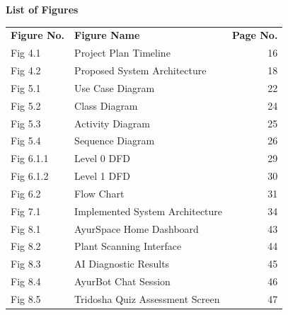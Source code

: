 \documentclass[12pt]{article}
\begin{document}
\thispagestyle{fancy}
\begin{center}
    \textbf{\LARGE List of Figures}
\end{center}

\vspace{1cm}

\begin{tabular}{ l l r }
\textbf{Figure No.} & \textbf{Figure Name} & \textbf{Page No.} \\[0.5cm]

Fig 4.1  & Project Plan Timeline           & 16 \\
Fig 4.2  & Proposed System Architecture    & 18 \\
Fig 5.1  & Use Case Diagram                & 22 \\
Fig 5.2  & Class Diagram                   & 24 \\
Fig 5.3  & Activity Diagram                & 25 \\
Fig 5.4  & Sequence Diagram                & 26 \\
Fig 6.1.1 & Level 0 DFD                   & 29 \\
Fig 6.1.2 & Level 1 DFD                   & 30 \\
Fig 6.2  & Flow Chart                      & 31 \\
Fig 7.1  & Implemented System Architecture & 34 \\
Fig 8.1  & AyurSpace Home Dashboard        & 43 \\
Fig 8.2  & Plant Scanning Interface        & 44 \\
Fig 8.3  & AI Diagnostic Results           & 45 \\
Fig 8.4  & AyurBot Chat Session            & 46 \\
Fig 8.5  & Tridosha Quiz Assessment Screen & 47 \\

\end{tabular}
\end{document}
